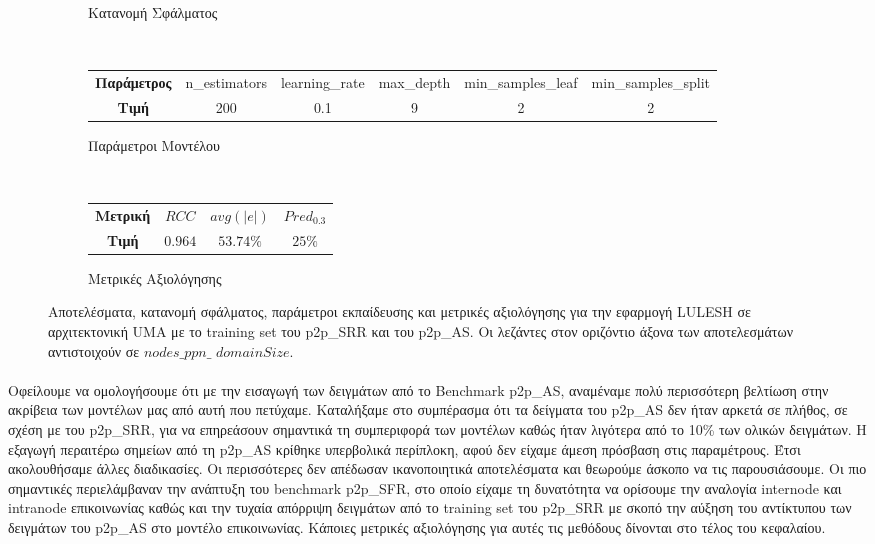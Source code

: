 \begin{figure}[ht]
\begin{subfigure}[b]{0.47\textwidth}
        \caption{Κατανομή Σφάλματος}
    \end{subfigure} 
    \\[0.3cm]
    \begin{subfigure}[b]{\textwidth}
   	 	\scriptsize
		\begin{tabular}{c||c|c|c|c|c}
			\textbf{Παράμετρος} & n\_estimators & learning\_rate & max\_depth & min\_samples\_leaf & min\_samples\_split \\
			\textbf{Τιμή}       &       200        &  0.1               & 9          &  2                  &    2                 
		\end{tabular}
		\caption{Παράμετροι Μοντέλου}
    \end{subfigure}
    \\[0.3cm]
    \begin{subfigure}[b]{\textwidth}
    		\centering
   	 	\scriptsize
		\begin{tabular}{c||c|c|c}
			\textbf{Μετρική} & $RCC$ &   $avg(|e|)$ & $Pred_{0.3}$  \\
			\textbf{Τιμή}  &  $0.964$   &      $53.74\%
			$        &  $25\%$                                         
		\end{tabular}
		\caption{Μετρικές Αξιολόγησης}
    \end{subfigure}
    
        \caption{Αποτελέσματα, κατανομή σφάλματος, παράμετροι εκπαίδευσης και μετρικές αξιολόγησης για την εφαρμογή LULESH σε αρχιτεκτονική UMA με το training set του p2p\_SRR και του p2p\_AS. Οι λεζάντες στον οριζόντιο άξονα των αποτελεσμάτων αντιστοιχούν σε $nodes\_ppn\_$ $domainSize$.}
    \label{fig:NB+cg_lulesh_UMA}
\end{figure}

\paragraph{}
Οφείλουμε να ομολογήσουμε ότι με την εισαγωγή των δειγμάτων από το Benchmark p2p\_AS, αναμέναμε πολύ περισσότερη βελτίωση στην ακρίβεια των μοντέλων μας από αυτή που πετύχαμε. Καταλήξαμε στο συμπέρασμα ότι τα δείγματα του p2p\_AS δεν ήταν αρκετά σε πλήθος, σε σχέση με του p2p\_SRR, για να επηρεάσουν σημαντικά τη συμπεριφορά των μοντέλων καθώς ήταν λιγότερα από το 10\% των ολικών δειγμάτων. Η εξαγωγή περαιτέρω σημείων από τη p2p\_AS κρίθηκε υπερβολικά περίπλοκη, αφού δεν είχαμε άμεση πρόσβαση στις παραμέτρους. Έτσι ακολουθήσαμε άλλες διαδικασίες. Οι περισσότερες δεν απέδωσαν ικανοποιητικά αποτελέσματα και θεωρούμε άσκοπο να τις παρουσιάσουμε. Οι πιο σημαντικές περιελάμβαναν την ανάπτυξη του benchmark p2p\_SFR, στο οποίο είχαμε τη δυνατότητα να ορίσουμε την αναλογία internode και intranode επικοινωνίας καθώς και την τυχαία απόρριψη δειγμάτων από το training set του p2p\_SRR με σκοπό την αύξηση του αντίκτυπου των δειγμάτων του p2p\_AS στο μοντέλο επικοινωνίας. Κάποιες μετρικές αξιολόγησης για αυτές τις μεθόδους δίνονται στο τέλος του κεφαλαίου.
